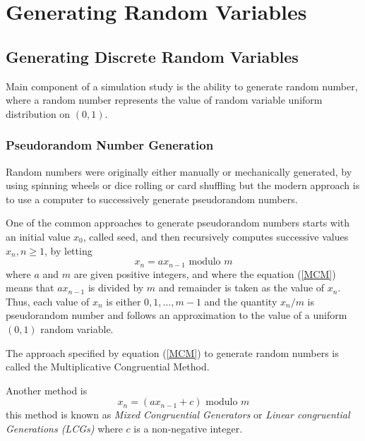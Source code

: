 \chapter{Generating Random Variables}

\section{Generating Discrete Random Variables}

Main component of a simulation study is the ability to generate random number, where a random number represents the value of random variable uniform
distribution on $(0,1)$. 
\subsection{Pseudorandom Number Generation}
Random numbers were originally either manually or mechanically generated, by using spinning wheels or dice rolling or card shuffling 
but the modern approach is to use a computer to successively generate pseudorandom numbers.

One of the common approaches to generate pseudorandom numbers starts with an initial value $x_0$, called seed, and then recursively computes 
successive values $x_n, n\ge1$, by letting
\begin{equation}
    \label{MCM}
    x_n = a x_{n-1} \text{ modulo } m 
\end{equation}
where $a$ and $m$ are given positive integers, and where the equation (\ref{MCM}) means that $ax_{n-1}$ is divided by  $m$ and remainder is taken as the 
value of $x_n$. Thus, each value of $x_n$ is either $0,1, \ldots, m-1$ and the quantity $x_n / m$ is pseudorandom number and follows 
an approximation to the value of a uniform $(0,1)$ random variable.

The approach specified by equation (\ref{MCM}) to generate random numbers is called the Multiplicative Congruential Method.

Another method is 
\[
    x_n = (a x_{n-1}+c) \text{ modulo } m
\] 
this method is known as \textit{Mixed Congruential Generators} or \textit{Linear congruential Generations (LCGs)} where $c$ is a non-negative integer.

